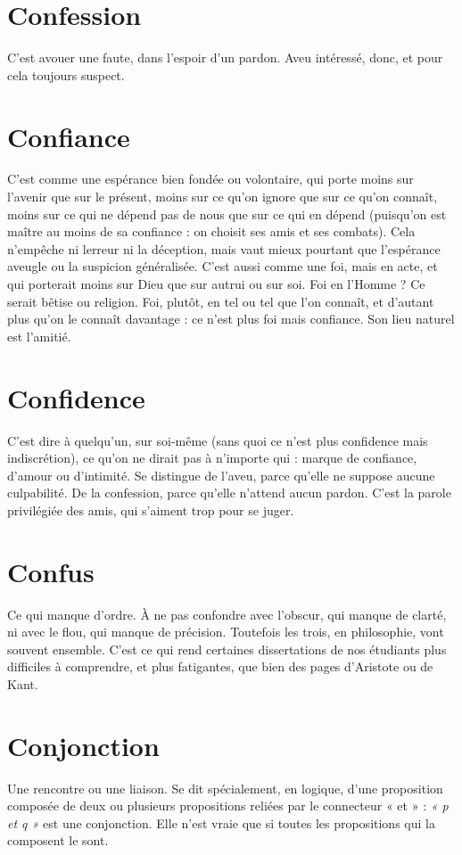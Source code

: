\section{Confession}
C’est avouer une faute, dans l'espoir d’un pardon. Aveu
intéressé, donc, et pour cela toujours suspect.

\section{Confiance}
C’est comme une espérance bien fondée ou volontaire, qui
porte moins sur l’avenir que sur le présent, moins sur ce
qu’on ignore que sur ce qu’on connaît, moins sur ce qui ne dépend pas de nous
que sur ce qui en dépend (puisqu'on est maître au moins de sa confiance : on
choisit ses amis et ses combats). Cela n'empêche ni lerreur ni la déception,
mais vaut mieux pourtant que l’espérance aveugle ou la suspicion généralisée.
C’est aussi comme une foi, mais en acte, et qui porterait moins sur Dieu
que sur autrui ou sur soi. Foi en l'Homme ? Ce serait bêtise ou religion. Foi,
plutôt, en tel ou tel que l’on connaît, et d’autant plus qu’on le connaît
davantage : ce n’est plus foi mais confiance. Son lieu naturel est l'amitié.

\section{Confidence}
C'est dire à quelqu'un, sur soi-même (sans quoi ce n’est plus
confidence mais indiscrétion), ce qu’on ne dirait pas à
n'importe qui : marque de confiance, d’amour ou d'intimité. Se distingue de
l’aveu, parce qu’elle ne suppose aucune culpabilité. De la confession, parce
qu’elle n’attend aucun pardon. C’est la parole privilégiée des amis, qui s’aiment
trop pour se juger.

\section{Confus}
Ce qui manque d’ordre. À ne pas confondre avec l’obscur, qui
manque de clarté, ni avec le flou, qui manque de précision. Toutefois
les trois, en philosophie, vont souvent ensemble. C’est ce qui rend certaines
dissertations de nos étudiants plus difficiles à comprendre, et plus fatigantes,
que bien des pages d’Aristote ou de Kant.

\section{Conjonction}
Une rencontre ou une liaison. Se dit spécialement, en
logique, d’une proposition composée de deux ou plusieurs
propositions reliées par le connecteur « et » : {\it « p et q »} est une conjonction.
Elle n’est vraie que si toutes les propositions qui la composent le sont.

